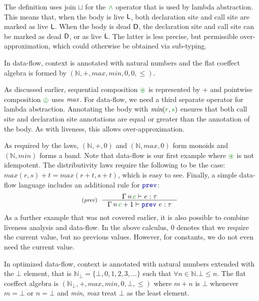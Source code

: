 The definition uses join $\sqcup$ for the $\czip$ operator that is used by lambda abstraction.
This means that, when the body is live $\textnormal{\sffamily L}$, both declaration site and call site are 
marked as live $\textnormal{\sffamily L}$. When the body is dead $\textnormal{\sffamily D}$, the declaration site and call site
can be marked as dead $\textnormal{\sffamily D}$, or as live $\textnormal{\sffamily L}$. The latter is less precise, but 
permissible over-approximation, which could otherwise be obtained via sub-typing.

\begin{example}
In data-flow, context is annotated with natural numbers and the flat coeffect algebra is formed 
by $(\mathbb{N}, +, \mathit{max}, \mathit{min}, 0, 0, \leq)$.
\end{example}

\noindent
As discussed earlier, sequential composition $\cseq$ is represented by $+$ and pointwise 
composition $\cpar$ uses $\emph{max}$. For data-flow, we need a third separate operator for
lambda abstraction. Annotating the body with $\emph{min}(\cclrd{r}, \cclrd{s})$ ensures that
both call site and declaration site annotations are equal or greater than the annotation 
of the body. As with liveness, this allows over-approximation. 

As required by the laws, $(\mathbb{N}, +, 0)$ and $(\mathbb{N}, \mathit{max}, 0)$ form monoids
and $(\mathbb{N}, \mathit{min})$ forms a band. Note that data-flow is our first example where 
$\cseq$ is not idempotent. The distributivity laws require the following to be the case:
$\mathit{max}(r,s) + t = \mathit{max}(r+t, s+t)$, which is easy to see. Finally, a simple 
data-flow language includes an additional rule for $\kvd{prev}$:
%
\begin{equation*}
\tyrule{prev}
  { \coctx{\Gamma}{\cclrd{c}} \vdash e : \tau }
  { \coctx{\Gamma}{\cclrd{c}+1} \vdash \kvd{prev}~e : \tau }
\end{equation*}
%
As a further example that was not covered earlier, it is also possible to combine liveness analysis
and data-flow. In the above calculus, $0$ denotes that we require the current value, but no previous
values. However, for constants, we do not even need the current value.

\begin{example}
In optimized data-flow, context is annotated with natural numbers extended with the $\bot$ element,
that is $\mathbb{N}_{\bot} = \{\bot, 0, 1, 2, 3, \ldots \}$ such that $\forall n \in \mathbb{N}. \bot \leq n$.
The flat coeffect algebra is $(\mathbb{N}_{\bot}, +, \mathit{max}, \mathit{min}, 0, \bot, \leq)$
where $m + n$ is $\bot$ whenever $m=\bot$ or $n=\bot$ and \emph{min}, \emph{max} treat $\bot$ as the
least element.
\end{example}

